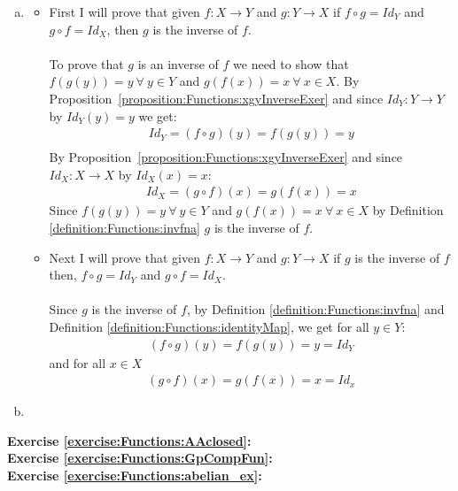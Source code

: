 \begin{enumerate}[(a)]
\item \label{InverseIdentityExers-Comp=Id}
	\begin{itemize}
	\item 
	First I will prove that given $f\colon X\to Y$ and $g\colon Y\to X$ if $f\circ g = Id_{Y}$ and $g\circ f = Id_{X}$, then $g$ is the inverse of $f$.\\
	\\
	To prove that $g$ is an inverse of $f$ we need to show that $f(g(y)) = y\ \forall\ y\in Y$ and $g(f(x)) = x\ \forall\ x\in X$. By  Proposition~\ref{proposition:Functions:xgyInverseExer} and since $Id_{Y}\colon Y\to Y$ by $Id_{Y}(y) = y$ we get:
	\begin{align*}
	Id_{Y} = (f\circ g)(y) = f(g(y)) = y\\
	\end{align*}
	By Proposition~\ref{proposition:Functions:xgyInverseExer} and since $Id_{X}\colon X\to X$ by $Id_{X}(x) = x$:
	\begin{align*}
	Id_{X} = (g\circ f)(x) = g(f(x)) = x
	\end{align*}
	Since $f(g(y)) = y\ \forall\ y\in Y$ and $g(f(x)) = x\ \forall\ x\in X$ by Definition \ref{definition:Functions:invfna} $g$ is the inverse of $f$.
            
	\item
	Next I will prove that given $f\colon X\to Y$ and $g\colon Y\to X$ if $g$ is the inverse of $f$ then, $f\circ g = Id_{Y}$ and $g\circ f = Id_{X}$.\\
	\\           
	Since $g$ is the inverse of $f$, by Definition \ref{definition:Functions:invfna} and Definition \ref{definition:Functions:identityMap}, we get for all $y\in Y$:
	\begin{align*}
	(f\circ g)(y) = f(g(y)) = y = Id_{Y}
	\end{align*}
   and for all $x\in X$
	\begin{align*}
	(g\circ f)(x) = g(f(x)) = x = Id_{x}
	\end{align*}
	\end{itemize}
	
\item \label{InverseIdentityExers-InvOfInv}
\end{enumerate}


\noindent\textbf{Exercise \ref{exercise:Functions:AAclosed}:}\\

\noindent\textbf{Exercise \ref{exercise:Functions:GpCompFun}:}\\

\noindent\textbf{Exercise \ref{exercise:Functions:abelian_ex}:}\\